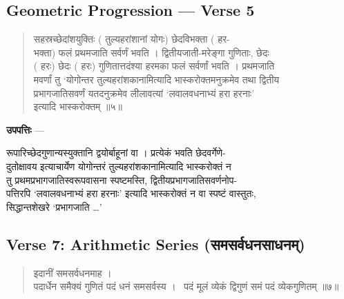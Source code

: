 \documentclass[11pt,a4paper]{article}
\newcommand{\dev}[1]{{\devanagarifont #1}}
\newcommand{\skt}[1]{{\devanagarifont\color{sktcolor} #1}}
\newenvironment{shloka}{%
  \begin{quote}%
  \smallskip%
  \devanagarifont\color{sktcolor}%
}{%
  \smallskip%
  \end{quote}%
}
\newenvironment{upapatti}{%
  \smallskip%
  \noindent\textbf{\devanagarifont उपपत्तिः} — \devanagarifont\small%
}{%
  \par\smallskip%
}
\begin{document}
\subsection*{Geometric Progression — Verse 5}

\begin{shloka}
\skt{सहस्रच्छेदांशयुक्तिः} (\skt{तुल्यहरांशानां योगः}) \skt{छेदविभक्ता} (\skt{हर-}\\
\skt{भक्ता}) \skt{फलं प्रथमजाति सर्वर्णं भवति । द्वितीयजाती-मरेङ्गा गुणिताः, छेदः}\\
(\skt{हरः}) \skt{छेदः} (\skt{हरः}) \skt{गुणितात्तदंश्या हरमका फलं सर्वर्णां भवति । प्रथमजाति}\\
\skt{मवर्णां तु `योगोन्तर तुल्यहरांशकानामित्यादि भास्करोक्तमनुक्रमेव तथा द्वितीय}\\
\skt{प्रभागजातिसवर्णं यतदनुक्रमेव लीलावत्यां `लवालवधनाभ्यं हरा हरनाः'}\\
\skt{इत्यादि भास्करोक्तम्} ॥५॥
\end{shloka}

\vspace{0.5cm}

\begin{upapatti}
\skt{रूपारिच्छेदगुणान्यस्युक्तानि द्वयोर्बाहूनां वा । प्रत्येकं भवति छेदवर्गेणे-}\\
\skt{दुतोक्षावय इत्याचार्येण योगोन्तरं तुल्यहरांशकानामित्यादि भास्करोक्तं न}\\
\skt{तु प्रथमप्रभागजातिस्वरूपवासना स्पष्टमस्ति, द्वितीयप्रभागजातिसवर्णनोप-}\\
\skt{पत्तिरपि `लवालवधनाभ्यं हरा हरनाः' इत्यादि भास्करोक्तं न वा स्पष्टं वास्तुतः,}\\
\skt{सिद्धान्तशेखरे `प्रभागजाति \ldots'}
\end{upapatti}

\subsection*{Verse 7: Arithmetic Series (\dev{समसर्वधनसाधनम्})}

\begin{shloka}
\skt{इदानीं समसर्वधनमाह ।}\\[0.5em]
\skt{पदार्धेन समैक्यं गुणितं पदं धनं समसर्वस्य ।}\
\skt{पदं मूलं व्येकं द्विगुणं समं पदं व्येकगुणितम्} ॥७॥
\end{shloka}
\end{document}
